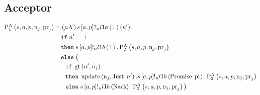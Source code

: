 \subsection{Acceptor}
\begin{align*}
\textstyle\operatorname{P^{A}_{1}}\left(
    s,
    a,
    p,
    \operatorname{n}_{j},
    \operatorname{pr}_{j}
\right) =
&
    \left(\mu X\right)
    s\left[a, p\right]?_u l1a \left\langle \bot \right\rangle \left(n'\right).
    \\
&
    \mathtt{if}\; n' = \bot
    \\
&
    \mathtt{then}\;
        s\left[a, p\right]!_u l1b \left\langle \bot \right\rangle.
        \textstyle\operatorname{P^{A}_{2}}\left(
            s,
            a,
            p,
            \operatorname{n}_{j},
            \operatorname{pr}_{j}
        \right)
    \\
&
    \mathtt{else}\; \big(\\
&\hspace*{0.75em * 1}
    \mathtt{if}\; \operatorname{gt}\left(n', \operatorname{n}_{j}\right)
    \\
&\hspace*{0.75em * 1}
    \mathtt{then}\;
        \operatorname{update} \left(\operatorname{n}_{j}, \operatorname{Just}\; n'\right).
        s\left[a, p\right]!_u l1b \left\langle \operatorname{Promise}\; \operatorname{pr} \right\rangle.
        \textstyle\operatorname{P^{A}_{2}}\left(
            s,
            a,
            p,
            \operatorname{n}_{j},
            \operatorname{pr}_{j}
        \right)
        \\
&\hspace*{0.75em * 1}
    \mathtt{else}\;
        s\left[a, p\right]!_u l1b \left\langle \operatorname{Nack} \right\rangle.
        \textstyle\operatorname{P^{A}_{2}}\left(
            s,
            a,
            p,
            \operatorname{n}_{j},
            \operatorname{pr}_{j}
        \right)
\big )
\end{align*}

